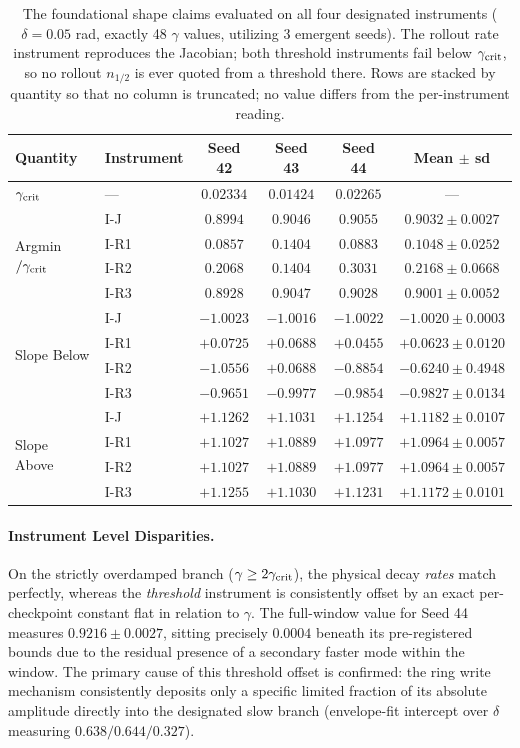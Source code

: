 \documentclass{article}
\begin{document}
\begin{table}[!htb]\centering\small
\caption{The foundational shape claims evaluated on all four designated instruments ($\delta=0.05$ rad, exactly 48 $\gamma$ values, utilizing 3 emergent seeds). The rollout rate instrument reproduces the Jacobian; both threshold instruments fail below $\gamma_{\rm crit}$, so no rollout $n_{1/2}$ is ever quoted from a threshold there. Rows are stacked by quantity so that no column is truncated; no value differs from the per-instrument reading.}
\begin{tabular}{llcccc}
\toprule
Quantity & Instrument & Seed 42 & Seed 43 & Seed 44 & Mean $\pm$ sd\\
\midrule
$\gamma_{\rm crit}$ & --- & $0.02334$ & $0.01424$ & $0.02265$ & ---\\
\midrule
\multirow{4}{*}{Argmin$/\gamma_{\rm crit}$} & I-J & $0.8994$ & $0.9046$ & $0.9055$ & $0.9032\pm0.0027$\\
 & I-R1 & $0.0857$ & $0.1404$ & $0.0883$ & $0.1048\pm0.0252$\\
 & I-R2 & $0.2068$ & $0.1404$ & $0.3031$ & $0.2168\pm0.0668$\\
 & I-R3 & $0.8928$ & $0.9047$ & $0.9028$ & $0.9001\pm0.0052$\\
\midrule
\multirow{4}{*}{Slope Below} & I-J & $-1.0023$ & $-1.0016$ & $-1.0022$ & $-1.0020\pm0.0003$\\
 & I-R1 & $+0.0725$ & $+0.0688$ & $+0.0455$ & $+0.0623\pm0.0120$\\
 & I-R2 & $-1.0556$ & $+0.0688$ & $-0.8854$ & $-0.6240\pm0.4948$\\
 & I-R3 & $-0.9651$ & $-0.9977$ & $-0.9854$ & $-0.9827\pm0.0134$\\
\midrule
\multirow{4}{*}{Slope Above} & I-J & $+1.1262$ & $+1.1031$ & $+1.1254$ & $+1.1182\pm0.0107$\\
 & I-R1 & $+1.1027$ & $+1.0889$ & $+1.0977$ & $+1.0964\pm0.0057$\\
 & I-R2 & $+1.1027$ & $+1.0889$ & $+1.0977$ & $+1.0964\pm0.0057$\\
 & I-R3 & $+1.1255$ & $+1.1030$ & $+1.1231$ & $+1.1172\pm0.0101$\\
\bottomrule
\end{tabular}
\end{table}

\paragraph{Instrument Level Disparities.} On the strictly overdamped branch ($\gamma\ge2\gamma_{\rm crit}$), the physical decay \emph{rates} match perfectly, whereas the \emph{threshold} instrument is consistently offset by an exact per-checkpoint constant flat in relation to $\gamma$. The full-window value for Seed 44 measures $0.9216\pm0.0027$, sitting precisely $0.0004$ beneath its pre-registered bounds due to the residual presence of a secondary faster mode within the window. The primary cause of this threshold offset is confirmed: the ring write mechanism consistently deposits only a specific limited fraction of its absolute amplitude directly into the designated slow branch (envelope-fit intercept over $\delta$ measuring $0.638/0.644/0.327$).
\end{document}
